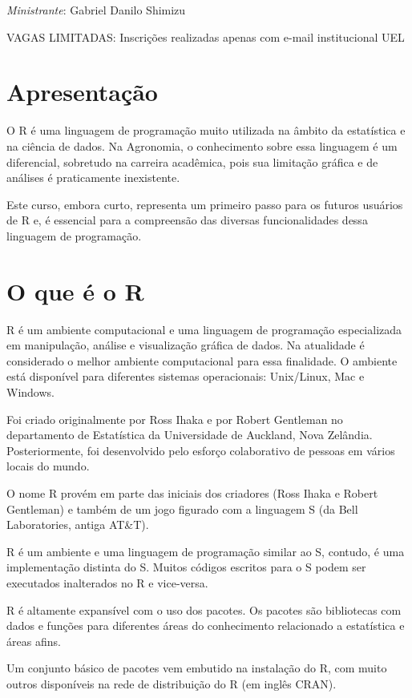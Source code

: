 \documentclass[
]{book}
\begin{document}
\emph{Ministrante}: Gabriel Danilo Shimizu

VAGAS LIMITADAS: Inscrições realizadas apenas com e-mail institucional UEL

\hypertarget{apresentauxe7uxe3o}{%
\chapter{Apresentação}\label{apresentauxe7uxe3o}}

O R é uma linguagem de programação muito utilizada na âmbito da estatística e na ciência de dados. Na Agronomia, o conhecimento sobre essa linguagem é um diferencial, sobretudo na carreira acadêmica, pois sua limitação gráfica e de análises é praticamente inexistente.

Este curso, embora curto, representa um primeiro passo para os futuros usuários de R e, é essencial para a compreensão das diversas funcionalidades dessa linguagem de programação.

\hypertarget{o-que-uxe9-o-r}{%
\chapter{O que é o R}\label{o-que-uxe9-o-r}}

R é um ambiente computacional e uma linguagem de programação especializada em manipulação, análise e visualização gráfica de dados. Na atualidade é considerado o melhor ambiente computacional para essa finalidade. O ambiente está disponível para diferentes sistemas operacionais: Unix/Linux, Mac e Windows.

Foi criado originalmente por Ross Ihaka e por Robert Gentleman no departamento de Estatística da Universidade de Auckland, Nova Zelândia. Posteriormente, foi desenvolvido pelo esforço colaborativo de pessoas em vários locais do mundo.

O nome R provém em parte das iniciais dos criadores (Ross Ihaka e Robert Gentleman) e também de um jogo figurado com a linguagem S (da Bell Laboratories, antiga AT\&T).

R é um ambiente e uma linguagem de programação similar ao S, contudo, é uma implementação distinta do S. Muitos códigos escritos para o S podem ser executados inalterados no R e vice-versa.

R é altamente expansível com o uso dos pacotes. Os pacotes são bibliotecas com dados e funções para diferentes áreas do conhecimento relacionado a estatística e áreas afins.

Um conjunto básico de pacotes vem embutido na instalação do R, com muito outros disponíveis na rede de distribuição do R (em inglês CRAN).
\end{document}
